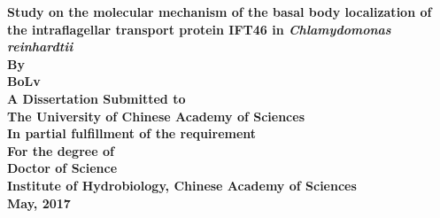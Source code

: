 \begin{titlepage}
\vspace*{20mm}
\centering
\large
\textbf{
Study on the molecular mechanism of the basal body localization of the intraflagellar transport protein IFT46 in \textit{Chlamydomonas reinhardtii}\\[40mm]
By\\
Bo\quad Lv\\[30mm]
A Dissertation Submitted to\\
The University of Chinese Academy of Sciences\\
In partial fulfillment of the requirement\\
For the degree of\\
Doctor of Science\\
\vspace{20mm}
Institute of Hydrobiology, Chinese Academy of Sciences\\
May, 2017
}
\end{titlepage}

\vspace*{10mm}
\thispagestyle{empty}




